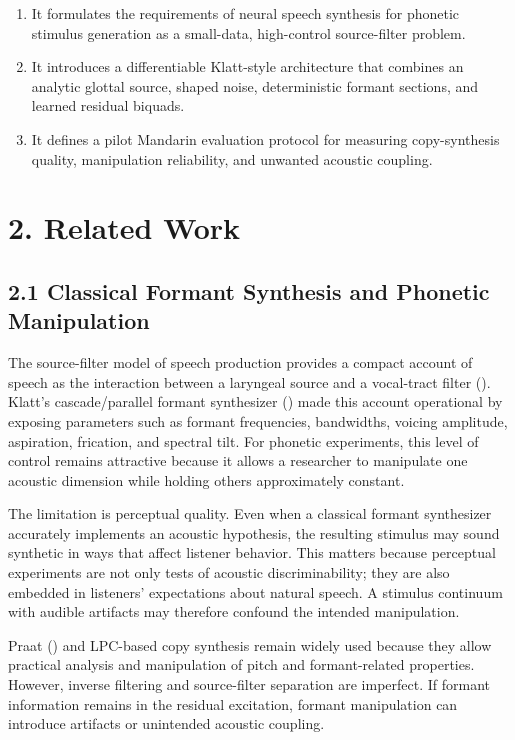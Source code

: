 \begin{enumerate}
\def\labelenumi{\arabic{enumi}.}
\tightlist
\item
  It formulates the requirements of neural speech synthesis for phonetic
  stimulus generation as a small-data, high-control source-filter
  problem.
\item
  It introduces a differentiable Klatt-style architecture that combines
  an analytic glottal source, shaped noise, deterministic formant
  sections, and learned residual biquads.
\item
  It defines a pilot Mandarin evaluation protocol for measuring
  copy-synthesis quality, manipulation reliability, and unwanted
  acoustic coupling.
\end{enumerate}

\section{2. Related Work}\label{related-work}

\subsection{2.1 Classical Formant Synthesis and Phonetic
Manipulation}\label{classical-formant-synthesis-and-phonetic-manipulation}

The source-filter model of speech production provides a compact account
of speech as the interaction between a laryngeal source and a
vocal-tract filter (). Klatt's
cascade/parallel formant synthesizer
() made this account
operational by exposing parameters such as formant frequencies,
bandwidths, voicing amplitude, aspiration, frication, and spectral tilt.
For phonetic experiments, this level of control remains attractive
because it allows a researcher to manipulate one acoustic dimension
while holding others approximately constant.

The limitation is perceptual quality. Even when a classical formant
synthesizer accurately implements an acoustic hypothesis, the resulting
stimulus may sound synthetic in ways that affect listener behavior. This
matters because perceptual experiments are not only tests of acoustic
discriminability; they are also embedded in listeners' expectations
about natural speech. A stimulus continuum with audible artifacts may
therefore confound the intended manipulation.

Praat () and LPC-based copy
synthesis remain widely used because they allow practical analysis and
manipulation of pitch and formant-related properties. However, inverse
filtering and source-filter separation are imperfect. If formant
information remains in the residual excitation, formant manipulation can
introduce artifacts or unintended acoustic coupling.


